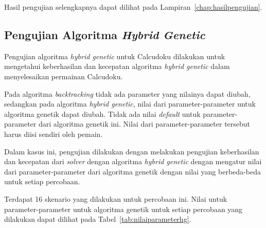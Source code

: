 Hasil pengujian selengkapnya dapat dilihat pada Lampiran~\ref{chap:hasilpengujian}.

\subsection{Pengujian Algoritma \textit{Hybrid Genetic}}
\label{sec:pengujianhybridgenetic}

Pengujian algoritma \textit{hybrid genetic} untuk Calcudoku dilakukan untuk mengetahui keberhasilan dan kecepatan algoritma \textit{hybrid genetic} dalam menyelesaikan permainan Calcudoku.

Pada algoritma \textit{backtracking} tidak ada parameter yang nilainya dapat diubah, sedangkan pada algoritma \textit{hybrid genetic}, nilai dari parameter-parameter untuk algoritma genetik dapat diubah. Tidak ada nilai \textit{default} untuk parameter-parameter dari algoritma genetik ini. Nilai dari parameter-parameter tersebut harus diisi sendiri oleh pemain.

Dalam kasus ini, pengujian dilakukan dengan melakukan pengujian keberhasilan dan kecepatan dari \textit{solver} dengan algoritma \textit{hybrid genetic} dengan mengatur nilai dari parameter-parameter dari algoritma genetik dengan nilai yang berbeda-beda untuk setiap percobaan.

Terdapat 16 skenario yang dilakukan untuk percobaan ini. Nilai untuk parameter-parameter untuk algoritma genetik untuk setiap percobaan yang dilakukan dapat dilihat pada Tabel~\ref{tab:nilaiparameterhg}.

